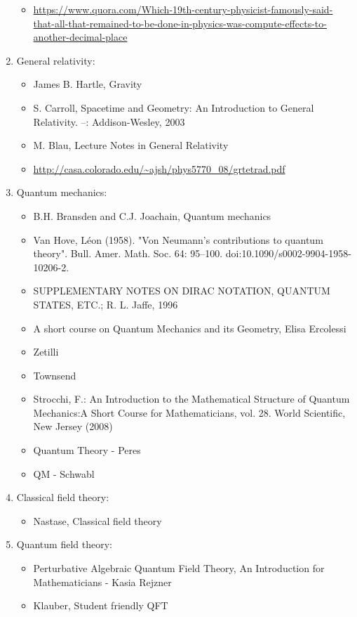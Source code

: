 \documentclass{report}
\begin{document}
\begin{enumerate}
\begin{itemize}
\item \url{https://www.quora.com/Which-19th-century-physicist-famously-said-that-all-that-remained-to-be-done-in-physics-was-compute-effects-to-another-decimal-place}
\end{itemize}
\item General relativity:
\begin{itemize}
\item James B. Hartle, Gravity
\item S. Carroll, Spacetime and Geometry: An Introduction to General Relativity. --: Addison-Wesley, 2003
\item M. Blau, Lecture Notes in General Relativity
\item \url{http://casa.colorado.edu/~ajsh/phys5770_08/grtetrad.pdf}
\end{itemize}
\item Quantum mechanics:
\begin{itemize}
\item B.H. Bransden and C.J. Joachain, Quantum mechanics
\item Van Hove, Léon (1958). "Von Neumann's contributions to quantum theory". Bull. Amer. Math. Soc. 64: 95–100. doi:10.1090/s0002-9904-1958-10206-2.
\item SUPPLEMENTARY NOTES ON DIRAC NOTATION,
QUANTUM STATES, ETC.; R. L. Jaffe, 1996
\item A short course on Quantum Mechanics and its Geometry, Elisa Ercolessi
\item Zetilli
\item Townsend
\item Strocchi, F.: An Introduction to the Mathematical Structure of Quantum Mechanics:A Short Course for Mathematicians, vol. 28. World Scientific, New Jersey (2008)
\item Quantum Theory - Peres
\item QM - Schwabl
\end{itemize}
\item Classical field theory:
\begin{itemize}
\item Nastase, Classical field theory
\end{itemize}
\item Quantum field theory:
\begin{itemize}
\item Perturbative Algebraic Quantum Field Theory, An Introduction for Mathematicians - Kasia Rejzner
\item Klauber, Student friendly QFT

\end{itemize}
\end{enumerate}
\end{document}
